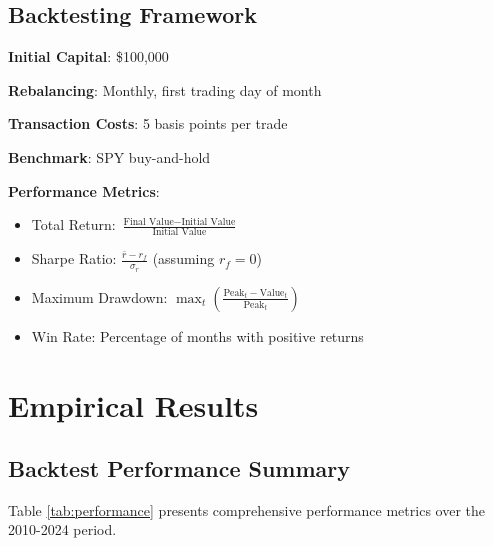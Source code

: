 \documentclass[12pt,a4paper]{article}
\begin{document}
\subsection{Backtesting Framework}

\textbf{Initial Capital}: \$100,000

\textbf{Rebalancing}: Monthly, first trading day of month

\textbf{Transaction Costs}: 5 basis points per trade

\textbf{Benchmark}: SPY buy-and-hold

\textbf{Performance Metrics}:
\begin{itemize}
    \item Total Return: $\frac{\text{Final Value} - \text{Initial Value}}{\text{Initial Value}}$
    \item Sharpe Ratio: $\frac{\bar{r} - r_f}{\sigma_r}$ (assuming $r_f = 0$)
    \item Maximum Drawdown: $\max_{t} \left( \frac{\text{Peak}_t - \text{Value}_t}{\text{Peak}_t} \right)$
    \item Win Rate: Percentage of months with positive returns
\end{itemize}

\newpage
\section{Empirical Results}

\subsection{Backtest Performance Summary}

Table \ref{tab:performance} presents comprehensive performance metrics over the 2010-2024 period.
\end{document}
